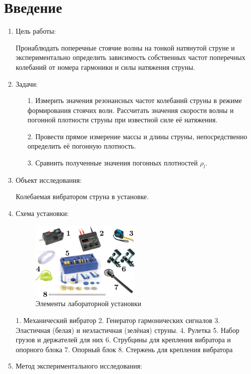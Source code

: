 \documentclass[12pt, a4paper]{article}
\begin{document}
\section{Введение}
\begin{enumerate}
\item Цель работы:

Пронаблюдать поперечные стоячие волны на тонкой натянутой струне и экспериментально определить зависимость собственных частот поперечных колебаний от номера гармоники и силы натяжения струны.
\item Задачи:
	\begin{enumerate}
		\item[1.]  Измерить значения резонансных частот колебаний струны в режиме формирования стоячих волн. Рассчитать значения скорости волны и погонной плотности струны при известной силе её натяжения.
		\item[2.] Провести прямое измерение массы и длины струны, непосредственно определить её погонную плотность.
		\item[3.] Сравнить полученные значения погонных плотностей $\rho_{l}$.
	\end{enumerate}
		
\item Объект исследования:

Колебаемая вибратором струна в установке.

\item Схема установки:
\begin{figure}[H]
\includegraphics[width=0.5\textwidth]{station.png}
\centering
\caption{Элементы лабораторной установки}
\end{figure}

1. Механический вибратор
2. Генератор гармонических сигналов
3. Эластичная (белая) и неэластичная (зелёная) струны.
4. Рулетка
5. Набор грузов и держателей для них
6. Струбцины для крепления вибратора и опорного блока
7. Опорный блок
8. Стержень для крепления вибратора

\item Метод экспериментального исследования:


\end{enumerate}
\end{document}
